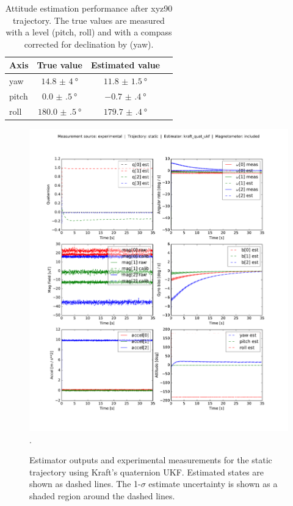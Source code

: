 \documentclass[conference]{IEEEtran}
\begin{document}
\begin{table}[!t]
    \renewcommand{\arraystretch}{1.3}
    \caption{Attitude estimation performance after xyz90 trajectory. The true values are measured with a level (pitch, roll) and with a compass corrected for declination by \cite{wmm} (yaw).}
    \label{table:att_est_perf_xyz90}
    \centering
    \begin{tabular}{|l|c|c|c|}
        \hline
        Axis & True value & Estimated value \\
        \hline
        yaw & $\SI[separate-uncertainty = true]{14.8(40)}{\degree}$ & $\SI[separate-uncertainty = true]{11.8(15)}{\degree}$ \\
        \hline
        pitch & $\SI[separate-uncertainty = true]{0.0(5)}{\degree}$ & $\SI[separate-uncertainty = true]{-0.7(4)}{\degree}$ \\
        \hline
        roll & $\SI[separate-uncertainty = true]{180.0(5)}{\degree}$ & $\SI[separate-uncertainty = true]{179.7(4)}{\degree}$\\
        \hline
    \end{tabular}
\end{table}

\begin{figure}[!t]
  \centering
  \includegraphics[width=7.5in]{figures/est_result_pickle_static_kraft_quat_ukf_mag.pdf}
  \DeclareGraphicsExtensions.
  \caption{Estimator outputs and experimental measurements for the static trajectory using Kraft's quaternion UKF. Estimated states are shown as dashed lines. The 1-$\sigma$ estimate uncertainty is shown as a shaded region around the dashed lines.}
  \label{fig:est_result_pickle_static_kraft_quat_ukf_mag}
\end{figure}
\end{document}

